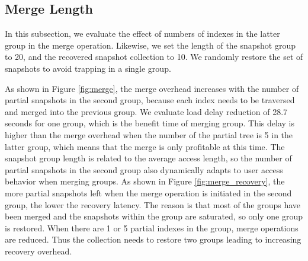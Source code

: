 \documentclass[sigconf, nonacm]{acmart}
\begin{document}
\subsection{Merge Length}
In this subsection, we evaluate the effect of numbers of indexes in the latter group in the merge operation. Likewise, we set the length of the snapshot group to 20, and the recovered snapshot collection to 10. We randomly restore the set of snapshots to avoid trapping in a single group.

As shown in Figure \ref{fig:merge}, the merge overhead increases with the number of partial snapshots in the second group, because each index needs to be traversed and merged into the previous group.
We evaluate load delay reduction of 28.7 seconds for one group, which is the benefit time of merging group. This delay is higher than the merge overhead when the number of the partial tree is 5 in the latter group, which means that the merge is only profitable at this time. The snapshot group length is related to the average access length, so the number of partial snapshots in the second group also dynamically adapts to user access behavior when merging groups. As shown in Figure \ref{fig:merge_recovery}, the more partial snapshots left when the merge operation is initiated in the second group, the lower the recovery latency. The reason is that most of the groups have been merged and the snapshots within the group are saturated, so only one group is restored. When there are 1 or 5 partial indexes in the group, merge operations are reduced. Thus the collection needs to restore two groups leading to increasing recovery overhead.

%
\end{document}
